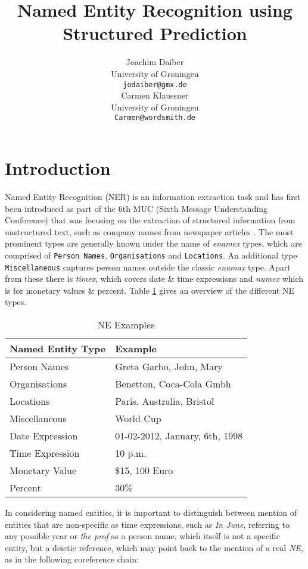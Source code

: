 \documentclass[11pt]{article}
\title{Named Entity Recognition using Structured Prediction}
\author{Joachim Daiber \\
  University of Groningen \\
  {\tt jodaiber@gmx.de} \\\And
  Carmen Klaussner \\
  University of Groningen \\
  {\tt Carmen@wordsmith.de} \\}
\date{}
\begin{document}
\maketitle

\section{Introduction}
Named Entity Recognition (NER) is an information extraction task and has first been introduced as part of the 6th MUC (Sixth Message Understanding Conference)
that was focusing on the extraction of structured information from unstructured text, such as company names from newspaper articles \cite{nadeau2007survey}.
The most prominent types are generally known under the name of \emph{enamex} types, which are comprised of \texttt{Person Names}, \texttt{Organisations} and \texttt{Locations}. 
An additional type \texttt{Miscellaneous} captures person names outside the classic \emph{enamax} type.
Apart from these there is \emph{timex}, which covers date \& time expressions and \emph{numex} which is for monetary values \& percent. 
Table \ref{table:NETypes} gives an overview of the different NE types.

\begin{table}[h!]
\scriptsize
\begin{tabular}{l|l}
\hline
\bf Named Entity Type & \bf Example \\
\hline
Person Names & Greta Garbo, John, Mary \\
Organisations& Benetton, Coca-Cola Gmbh\\
Locations&  Paris, Australia, Bristol\\
Miscellaneous& World Cup\\
 Date Expression& 01-02-2012, January, 6th, 1998 \\
Time Expression & 10 p.m.\\
Monetary Value &  \$15, 100 Euro   \\
Percent &   30\%
\end{tabular}
\caption{NE Examples}
\label{table:NETypes}
\end{table}


In considering named entities, it is important to distinguish between mention of entities that are non-specific as 
time expressions, such as \emph{In June}, referring to any possible year or \emph{the prof} as a person name, which itself is not a specific entity, 
but a deictic reference, which may point back to the mention of a real \emph{NE}, as in the following coreference chain: \\
\end{document}
